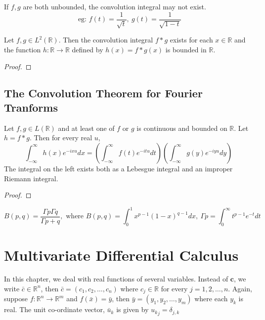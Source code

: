 \begin{remark}
	If $f,g$ are both unbounded, the convolution integral may not exist.
	\[ \text{ eg: } f(t) = \frac{1}{\sqrt{t}},\ g(t) = \frac{1}{\sqrt{1-t}} \]
\end{remark}

\begin{theorem}
	Let \( f,g \in L^2(\mathbb{R}) \).
	Then the convolution integral $f \ast g$ exists for each \( x \in \mathbb{R} \) and the function \( h : \mathbb{R} \to \mathbb{R} \) defined by \( h(x) = f \ast g (x) \) is bounded in $\mathbb{R}$.
\end{theorem}
\begin{synopsis}
\end{synopsis}
\begin{proof}
\end{proof}

\subsection{The Convolution Theorem for Fourier Tranforms}
\begin{theorem}
	Let \( f,g \in L(\mathbb{R}) \) and at least one of $f$ or $g$ is continuous and bounded on $\mathbb{R}$.
	Let \( h = f \ast g \).
	Then for every real $u$,
	\[ \int_{-\infty}^\infty h(x) e^{-ixu} dx = \left( \int_{-\infty}^\infty f(t) e^{-itu} dt \right) \left( \int_{-\infty}^\infty g(y) e^{-iyu} dy \right) \]
	The integral on the left exists both as a Lebesgue integral and an improper Riemann integral.
\end{theorem}
\begin{synopsis}
\end{synopsis}
\begin{proof}
\end{proof}

\begin{remark}
	\[ B(p,q) = \frac{\Gamma{p} \Gamma{q}}{\Gamma{p+q}},\text{ where } B(p,q) = \int_0^1 x^{p-1} (1-x)^{q-1} dx,\ \Gamma{p} = \int_0^\infty t^{p-1} e^{-t} dt \]
\end{remark}

\section{Multivariate Differential Calculus}

In this chapter, we deal with real functions of several variables.
Instead of $\mathbf{c}$, we write \( \bar{c} \in \mathbb{R}^n \), then \( \bar{c} = (c_1, c_2, \dotsc, c_n) \) where \( c_j \in \mathbb{R} \) for every \(j = 1,2, \dotsc, n\).
Again, suppose \(f : \mathbb{R}^n \to \mathbb{R}^m\) and \(f(\bar{x}) = \bar{y}\), then \(\bar{y} = (y_1, y_2, \dotsc, y_m)\) where each $y_k$ is real.
The unit co-ordinate vector, $\bar{u}_k$ is given by \( {u_k}_j = \delta_{j,k} \)

